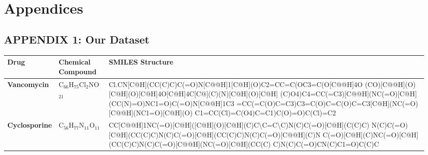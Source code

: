 \documentclass[conference]{IEEEtran}
\begin{document}
\onecolumn
\section*{Appendices}
\subsection*{\centering APPENDIX 1: Our Dataset}
\begin{table}[h]
  \centering
  \renewcommand{\arraystretch}{1.2}
  \begin{tabular}{|>{\bfseries}l|l|p{10cm}|}
    \hline
    \rowcolor{headercolor}
    \textbf{Drug}                            & \textbf{Chemical Compound}             & \textbf{SMILES Structure}                                                                                                                                                                                                                                                                                                                                                                                                                                                                                                                                                       \\
    \hline
    Vancomycin                               & C$_{66}$H$_{75}$Cl$_2$NO$_{21}$        & Cl.CN[C@H](CC(C)C)C(=O)N[C@@H]1[C@H](O)C2=CC=C(OC3=C(O[C@@H]4O \newline [C@H](CO)[C@@H](O)[C@H](O)[C@H]4O[C@H]4C[C@](C)(N)[C@H](O)[C@H] \newline (C)O4)C4=CC(=C3)[C@@H](NC(=O)[C@H](CC(N)=O)NC1=O)C(=O)N[C@@H]1C3 \newline =CC(=C(O)C=C3)C3=C(O)C=C(O)C=C3[C@H](NC(=O)[C@@H](NC1=O)[C@H](O) \newline C1=CC(Cl)=C(O4)C=C1)C(O)=O)C(Cl)=C2                                                                                                                                                                                                                                        \\
    \hline
    Cyclosporine                             & C$_{56}$H$_{77}$N$_{11}$O$_{11}$       & CC[C@@H]1NC(=O)[C@H]([C@H](O)[C@H](C)C\textbackslash C=C\textbackslash C)N(C)C(=O)[C@H](C(C)C) \newline N(C)C(=O)[C@H](CC(C)C)N(C)C(=O)[C@H](CC(C)C)N(C)C(=O)[C@@H](C)N \newline C(=O)[C@H](C)NC(=O)[C@H](CC(C)C)N(C)C(=O)[C@@H](NC(=O)[C@H](CC(C) \newline C)N(C)C(=O)CN(C)C1=O)C(C)C                                                                                                                                                                                                                                                                                          \\

\end{tabular}
\end{table}
\end{document}
